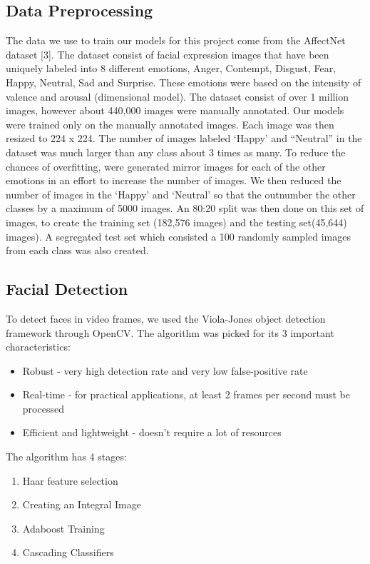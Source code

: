 \documentclass[10pt,twocolumn,letterpaper]{article}
\begin{document}
\subsection{Data Preprocessing}

The data we use to train our models for this project come from the AffectNet dataset [3]. The dataset consist of facial expression images that have been uniquely labeled into 8 different emotions, Anger, Contempt, Disgust, Fear, Happy, Neutral, Sad and Surprise. These emotions were based on the intensity of valence and arousal (dimensional model). The dataset consist of over 1 million images, however about 440,000 images were manually annotated. Our models were trained only on the manually annotated images.
Each image was then resized to 224 x 224. The number of images labeled ‘Happy’ and “Neutral” in the dataset was much larger than any class about 3 times as many. To reduce the chances of overfitting, were generated mirror images for each of the other emotions in an effort to increase the number of images. We then reduced the number of images in the ‘Happy’  and ‘Neutral’ so that the outnumber the other classes by a maximum of 5000 images.
An 80:20 split was then done on this set of images, to create the training set (182,576 images) and the testing set(45,644) images). A segregated test set which consisted a 100 randomly sampled images from each class was also created. 


\subsection{Facial Detection}

To detect faces in video frames, we used the Viola-Jones object detection framework through OpenCV. The algorithm was picked for its 3 important characteristics:
\begin{itemize}
  \item Robust - very high detection rate and very low false-positive rate
  \item Real-time - for practical applications, at least 2 frames per second must be processed
  \item Efficient and lightweight - doesn’t require a lot of resources
\end{itemize}

The algorithm has 4 stages:
\begin{enumerate}
  \item Haar feature selection
  \item Creating an Integral Image
  \item Adaboost Training
  \item Cascading Classifiers
\end{enumerate}
\end{document}
